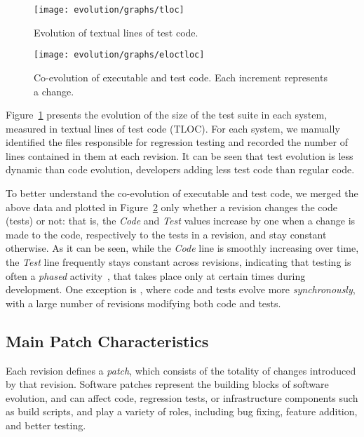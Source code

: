 \begin{figure}[t]
\centering
\texttt{[image: evolution/graphs/tloc]}
\caption{Evolution of textual lines of test code.}
\label{fig:tloc-evol}
\end{figure}


\begin{figure}[t]
\centering
\texttt{[image: evolution/graphs/eloctloc]}
\caption{Co-evolution of executable and test code. Each increment represents a change.}
\label{fig:coeloctloc}
\end{figure}


Figure~\ref{fig:tloc-evol} presents the evolution of the size of the
test suite in each system, measured in textual lines of test code
(TLOC).  For each system, we manually identified the files responsible
for regression testing and recorded the number of lines contained in
them at each revision. It can be seen that test evolution is less
dynamic than code evolution, developers adding less test code than
regular code.


To better understand the co-evolution of executable and test code, we
merged the above data and plotted in Figure~\ref{fig:coeloctloc}
only whether a revision changes the code (tests) or not: that is,
the \emph{Code} and \emph{Test} values increase by one when a change is
made to the code, respectively to the tests in a revision, and stay constant
otherwise.  As it can be seen, while the \emph{Code} line is smoothly
increasing over time, the \emph{Test} line frequently stays constant
across revisions, indicating that testing is often a \textit{phased}
activity~\cite{coevol:emse11}, that takes place only at certain times
during development. One exception is \git, where code and
tests evolve more \textit{synchronously}, with a large number of
revisions modifying both code and tests.

\subsection{Main Patch Characteristics}


Each revision defines a \textit{patch}, which consists of the totality
of changes introduced by that revision.  Software patches represent
the building blocks of software evolution, and 
can affect code, regression tests, or infrastructure components such
as build scripts, and play a variety of roles, including bug fixing,
feature addition, and better testing.  

